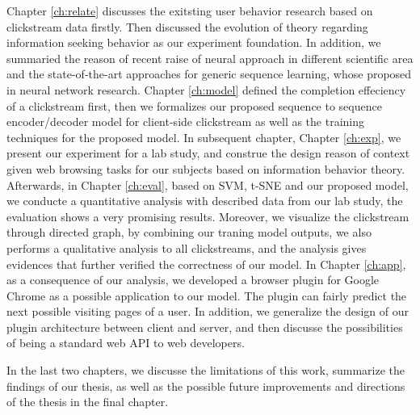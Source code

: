 Chapter \ref{ch:relate} discusses the exitsting user behavior research based on clickstream data firstly. 
Then discussed the evolution of theory regarding information seeking behavior as our experiment foundation.
In addition, we summaried the reason of recent raise of neural approach in different scientific 
area and the state-of-the-art approaches for generic sequence learning, whose proposed in neural network research.
Chapter \ref{ch:model} defined the completion effeciency of a clickstream first, then we
formalizes our proposed sequence to sequence encoder/decoder model for client-side
clickstream as well as the training techniques for the proposed model.
In subsequent chapter, Chapter \ref{ch:exp}, we present our experiment for a lab study,
and construe the design reason of context given web browsing tasks for our subjects based on information behavior theory.
Afterwards, in Chapter \ref{ch:eval}, based on SVM, t-SNE and our proposed model, 
we conducte a quantitative analysis with described data from our lab study, 
the evaluation shows a very promising results.
Moreover, we visualize the clickstream through directed graph, by combining our traning model outputs,
we also performs a qualitative analysis to all clickstreams, and the analysis gives evidences that further 
verified the correctness of our model.
In Chapter \ref{ch:app}, as a consequence of our analysis, we developed a browser plugin 
for Google Chrome as a possible application to our model. The plugin can fairly predict 
the next possible visiting pages of a user. In addition, we generalize the design of
our plugin architecture between client and server,
and then discusse the possibilities of being a standard web API to web developers.

In the last two chapters, we discusse the limitations of this work, summarize the findings of our thesis, 
as well as the possible future improvements and directions of the thesis in the final chapter.
\cleardoublepage